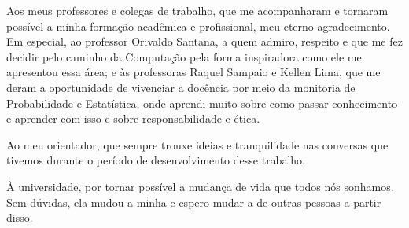 \begin{trivlist}
  \item Aos meus professores e colegas de trabalho, que me acompanharam e tornaram possível a minha formação acadêmica e profissional, meu eterno agradecimento. Em especial, ao professor Orivaldo Santana, a quem admiro, respeito e que me fez decidir pelo caminho da Computação pela forma inspiradora como ele me apresentou essa área; e às professoras Raquel Sampaio e Kellen Lima, que me deram a oportunidade de vivenciar a docência por meio da monitoria de Probabilidade e Estatística, onde aprendi muito sobre como passar conhecimento e aprender com isso e sobre responsabilidade e ética.

  \item Ao meu orientador, que sempre trouxe ideias e tranquilidade nas conversas que tivemos durante o período de desenvolvimento desse trabalho.

  \item À universidade, por tornar possível a mudança de vida que todos nós sonhamos. Sem dúvidas, ela mudou a minha e espero mudar a de outras pessoas a partir disso.

\end{trivlist}
